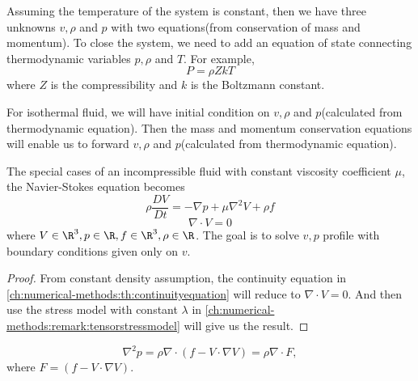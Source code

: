 \begin{refsection}
\begin{remark}
	Assuming the temperature of the system is constant, then we have three unknowns $v,\rho$ and $p$ with two equations(from conservation of mass and momentum). To close the system, we need to add an equation of state connecting thermodynamic variables $p,\rho$ and $T$. For example, 
	$$P = \rho ZkT$$
	where $Z$ is the compressibility and $k$ is the Boltzmann constant. 	
\end{remark}

\begin{remark}\label{ch:numerical-methods:remark:numericalmethodisothermalcompressiblefluid}
	For isothermal fluid, we will have initial condition on $v, \rho$ and $p$(calculated from thermodynamic equation). Then the mass and momentum conservation equations will enable us to forward $v, \rho$ and $p$(calculated from thermodynamic equation). 
\end{remark}



\begin{lemma}\cite[19]{zikanov2010essential}
	The special cases of an incompressible fluid with constant viscosity coefficient $\mu$, the Navier-Stokes equation becomes
	$$\rho \frac{DV}{Dt} = -\nabla p + \mu \nabla^2 V + \rho f$$
	$$\nabla \cdot V = 0$$
	where $V\in \R^3, p\in \R, f\in \R^3,\rho\in \R$.
	The goal is to solve $v,p$ profile with boundary conditions given only on $v$.
\end{lemma}
\begin{proof}
	From constant density assumption, the continuity equation in \autoref{ch:numerical-methods:th:continuityequation} will reduce to $\nabla \cdot V = 0$. And then use the stress model with constant $\lambda$ in \autoref{ch:numerical-methods:remark:tensorstressmodel} will give us the result.
\end{proof}


\begin{lemma}\label{ch:numerical-methods:th:pressureequationincompressibleflow}
	$$\nabla^2 p = \rho\nabla \cdot (f - V\cdot \nabla V) = \rho \nabla \cdot F,$$
	where $F = (f - V\cdot \nabla V). $
\end{lemma}



\end{refsection}
